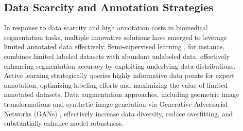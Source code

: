 \documentclass[./dissertation.tex]{subfiles}
\begin{document}


\subsection{Data Scarcity and Annotation Strategies}

In response to data scarcity and high annotation costs in biomedical segmentation tasks, multiple innovative solutions have emerged to leverage limited annotated data effectively. Semi-supervised learning \cite{van2020survey}, for instance, combines limited labeled datasets with abundant unlabeled data, effectively enhancing segmentation accuracy by exploiting underlying data distributions. Active learning \cite{settles2009active} strategically queries highly informative data points for expert annotation, optimizing labeling efforts and maximizing the value of limited annotated datasets. Data augmentation approaches, including geometric image transformations and synthetic image generation via Generative Adversarial Networks (GANs) \cite{goodfellow2014generative}, effectively increase data diversity, reduce overfitting, and substantially enhance model robustness.
\end{document}
